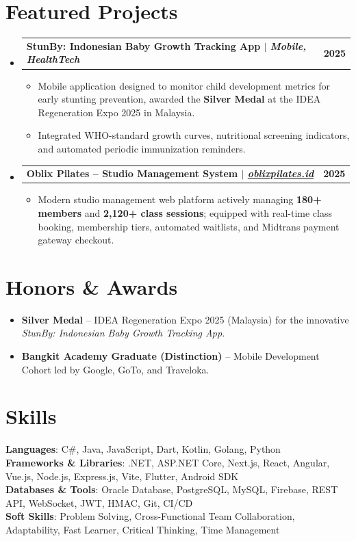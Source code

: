 \documentclass[letterpaper,10pt]{article}
\makeatletter
\newcommand{\resumeItem}[1]{
  \item\small{
    {#1 \vspace{-1.5pt}}
  }
}
\newcommand{\resumeProjectHeading}[2]{
  \vspace{1pt}\item
    \begin{tabular*}{1.0\textwidth}[t]{l@{\extracolsep{\fill}}r}
      \textbf{#1} & \textbf{\small #2} \\
    \end{tabular*}\vspace{-4pt}
}
\newcommand{\resumeSubHeadingListStart}{\begin{itemize}[leftmargin=0.0in, label={}]}
\newcommand{\resumeSubHeadingListEnd}{\end{itemize}\vspace{1pt}}
\newcommand{\resumeItemListStart}{\begin{itemize}[leftmargin=0.15in, label={--}, itemsep=1.5pt, parsep=0pt]}
\newcommand{\resumeItemListEnd}{\end{itemize}\vspace{-2pt}}
\makeatother
\begin{document}
\section{Featured Projects}
\resumeSubHeadingListStart
    \resumeProjectHeading
      {\textbf{StunBy: Indonesian Baby Growth Tracking App} $|$ \emph{Mobile, HealthTech}}{2025}
      \resumeItemListStart
        \resumeItem{Mobile application designed to monitor child development metrics for early stunting prevention, awarded the \textbf{Silver Medal} at the IDEA Regeneration Expo 2025 in Malaysia.}
        \resumeItem{Integrated WHO-standard growth curves, nutritional screening indicators, and automated periodic immunization reminders.}
      \resumeItemListEnd

    \resumeProjectHeading
      {\textbf{Oblix Pilates -- Studio Management System} $|$ \emph{\href{https://oblixpilates.id}{oblixpilates.id}}}{2025}
      \resumeItemListStart
        \resumeItem{Modern studio management web platform actively managing \textbf{180+ members} and \textbf{2,120+ class sessions}; equipped with real-time class booking, membership tiers, automated waitlists, and Midtrans payment gateway checkout.}
      \resumeItemListEnd
\resumeSubHeadingListEnd

\section{Honors \& Awards}
\resumeItemListStart
    \resumeItem{\textbf{Silver Medal} -- IDEA Regeneration Expo 2025 (Malaysia) for the innovative \textit{StunBy: Indonesian Baby Growth Tracking App}.}
    \resumeItem{\textbf{Bangkit Academy Graduate (Distinction)} -- Mobile Development Cohort led by Google, GoTo, and Traveloka.}
\resumeItemListEnd

\section{Skills}
\begin{itemize}[leftmargin=0.0in, label={}]
    \small{\item{
     \textbf{Languages}{: C\#, Java, JavaScript, Dart, Kotlin, Golang, Python} \\ \vspace{3pt}
     \textbf{Frameworks \& Libraries}{: .NET, ASP.NET Core, Next.js, React, Angular, Vue.js, Node.js, Express.js, Vite, Flutter, Android SDK} \\ \vspace{3pt}
     \textbf{Databases \& Tools}{: Oracle Database, PostgreSQL, MySQL, Firebase, REST API, WebSocket, JWT, HMAC, Git, CI/CD} \\ \vspace{3pt}
     \textbf{Soft Skills}{: Problem Solving, Cross-Functional Team Collaboration, Adaptability, Fast Learner, Critical Thinking, Time Management}
    }}
\end{itemize}
\end{document}
